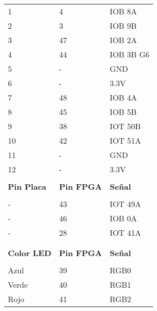 \begin{table}[h!]
\begin{tabular}[t]{C{0.12\textwidth} C{0.12\textwidth} C{0.15\textwidth}}
		1 & 4 & IOB 8A \\
		2 & 3 & IOB 9B \\
		3 & 47 & IOB 2A \\
		4 & 44 & IOB 3B G6 \\
		5 & - & GND \\
		6 & - & 3.3V \\
		7 & 48 & IOB 4A \\
		8 & 45 & IOB 5B \\
		9 & 38 & IOT 50B \\
		10 & 42 & IOT 51A \\
		11 & - & GND \\
		12 & - & 3.3V \\
		& & \\
		\bfseries Pin Placa & \bfseries Pin FPGA & \bfseries Señal \\ \hline
		  \\ \hline
		 - & 43 & IOT 49A \\
		- & 46 & IOB 0A \\
		- & 28 & IOT 41A \\	
		& & \\
		& & \\
		\bfseries Color LED & \bfseries Pin FPGA & \bfseries Señal \\ \hline
		  \\   \hline
		Azul & 39 & RGB0 \\
		Verde & 40 & RGB1 \\
		Rojo & 41 & RGB2 \\
	\end{tabular}
\end{table}

